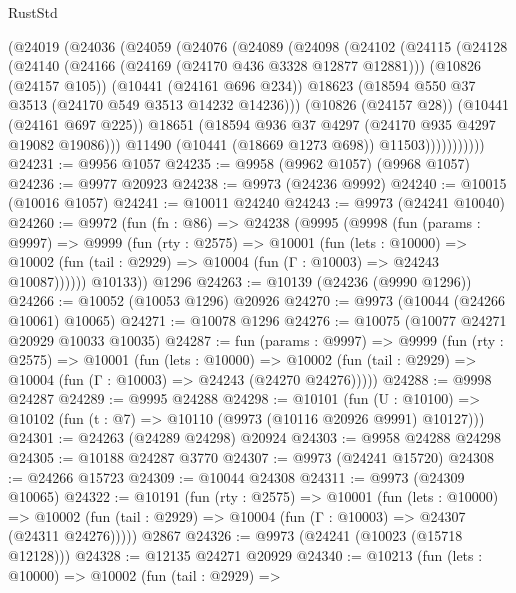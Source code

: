 \begin{lexlean}{RustStd}
\begin{coremodule}
          (@24019
            (@24036
              (@24059
                (@24076
                  (@24089
                    (@24098
                      (@24102
                        (@24115
                          (@24128
                            (@24140
                              (@24166 (@24169 (@24170 @436 @3328 @12877 @12881)))
                              (@10826 (@24157 @105))
                              (@10441 (@24161 @696 @234))
                              @18623
                              (@18594 @550 @37 @3513 (@24170 @549 @3513 @14232 @14236)))
                            (@10826 (@24157 @28))
                            (@10441 (@24161 @697 @225))
                            @18651
                            (@18594 @936 @37 @4297 (@24170 @935 @4297 @19082 @19086)))
                          @11490
                          (@10441 (@18669 @1273 @698))
                          @11503)))))))))))
@24231 := @9956 @1057
@24235 := @9958 (@9962 @1057) (@9968 @1057)
@24236 := @9977 @20923
@24238 := @9973 (@24236 @9992)
@24240 := @10015 (@10016 @1057)
@24241 := @10011 @24240
@24243 := @9973 (@24241 @10040)
@24260 := @9972
    (fun (fn : @86) =>
    @24238
      (@9995
        (@9998
          (fun (params : @9997) =>
          @9999
            (fun (rty : @2575) =>
            @10001
              (fun (lets : @10000) =>
              @10002 (fun (tail : @2929) => @10004 (fun (Γ : @10003) => @24243 @10087))))))
        @10133))
    @1296
@24263 := @10139 (@24236 (@9990 @1296))
@24266 := @10052 (@10053 @1296) @20926
@24270 := @9973 (@10044 (@24266 @10061) @10065)
@24271 := @10078 @1296
@24276 := @10075 (@10077 @24271 @20929 @10033 @10035)
@24287 := fun (params : @9997) =>
  @9999
    (fun (rty : @2575) =>
    @10001
      (fun (lets : @10000) =>
      @10002 (fun (tail : @2929) => @10004 (fun (Γ : @10003) => @24243 (@24270 @24276)))))
@24288 := @9998 @24287
@24289 := @9995 @24288
@24298 := @10101
    (fun (U : @10100) => @10102 (fun (t : @7) => @10110 (@9973 (@10116 @20926 @9991) @10127)))
@24301 := @24263 (@24289 @24298) @20924
@24303 := @9958 @24288 @24298
@24305 := @10188 @24287 @3770
@24307 := @9973 (@24241 @15720)
@24308 := @24266 @15723
@24309 := @10044 @24308
@24311 := @9973 (@24309 @10065)
@24322 := @10191
    (fun (rty : @2575) =>
    @10001
      (fun (lets : @10000) =>
      @10002 (fun (tail : @2929) => @10004 (fun (Γ : @10003) => @24307 (@24311 @24276)))))
    @2867
@24326 := @9973 (@24241 (@10023 (@15718 @12128)))
@24328 := @12135 @24271 @20929
@24340 := @10213
    (fun (lets : @10000) =>
    @10002
      (fun (tail : @2929) =>

\end{coremodule}
\end{lexlean}
